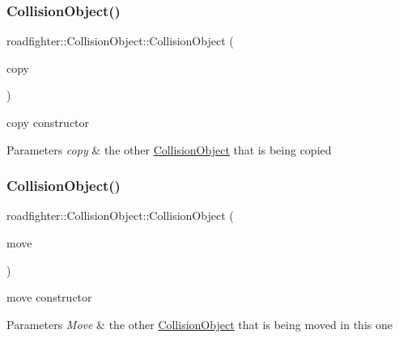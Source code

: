 \subsubsection{\texorpdfstring{Collision\+Object()}{CollisionObject()}\hspace{0.1cm}{\footnotesize\ttfamily [3/4]}}
{\footnotesize\ttfamily roadfighter\+::\+Collision\+Object\+::\+Collision\+Object (\begin{DoxyParamCaption}\item[{const \hyperlink{classroadfighter_1_1CollisionObject}{Collision\+Object} \&}]{copy }\end{DoxyParamCaption})\hspace{0.3cm}{\ttfamily [default]}}

copy constructor 
\begin{DoxyParams}{Parameters}
{\em copy} & the other \hyperlink{classroadfighter_1_1CollisionObject}{Collision\+Object} that is being copied \\
\hline
\end{DoxyParams}
\mbox{\label{classroadfighter_1_1CollisionObject_a45af317bbabd99cf64e0ba87241df509}} 
\subsubsection{\texorpdfstring{Collision\+Object()}{CollisionObject()}\hspace{0.1cm}{\footnotesize\ttfamily [4/4]}}
{\footnotesize\ttfamily roadfighter\+::\+Collision\+Object\+::\+Collision\+Object (\begin{DoxyParamCaption}\item[{\hyperlink{classroadfighter_1_1CollisionObject}{Collision\+Object} \&\&}]{move }\end{DoxyParamCaption})\hspace{0.3cm}{\ttfamily [default]}}

move constructor 
\begin{DoxyParams}{Parameters}
{\em Move} & the other \hyperlink{classroadfighter_1_1CollisionObject}{Collision\+Object} that is being moved in this one \\
\hline
\end{DoxyParams}
\mbox{\label{classroadfighter_1_1CollisionObject_aabc3bc7bef3a50923856fd82e39f59a1}} 
